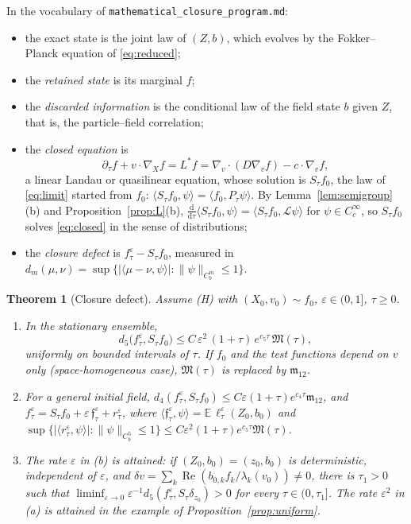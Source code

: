 \documentclass[11pt]{article}
\newcommand{\dd}{\mathrm{d}}
\newcommand{\E}{\mathbb{E}}
\newcommand{\eps}{\varepsilon}
\newcommand{\cL}{\mathcal{L}}
\newcommand{\fm}{\mathfrak{m}}
\newcommand{\fM}{\mathfrak{M}}
\renewcommand{\Re}{\operatorname{Re}}
\newcommand{\nrm}[2]{\|#1\|_{#2}}
\newtheorem{theorem}{Theorem}
\theoremstyle{remark}
\begin{document}
In the vocabulary of \texttt{mathematical\_closure\_program.md}:
\begin{itemize}
  \item the exact state is the joint law of $(Z,b)$, which evolves by the
    Fokker--Planck equation of \eqref{eq:reduced};
  \item the \emph{retained state} is its marginal $f$;
  \item the \emph{discarded information} is the conditional law of the
    field state $b$ given $Z$, that is, the particle--field correlation;
  \item the \emph{closed equation} is
    \begin{equation}
      \partial_\tau f+v\cdot\nabla_Xf=L^*f
      =\nabla_v\cdot(D\nabla_vf)-c\cdot\nabla_vf ,
      \label{eq:closed}
    \end{equation}
    a linear Landau or quasilinear equation, whose solution is
    $S_\tau f_0$, the law of \eqref{eq:limit} started from $f_0$:
    $\langle S_\tau f_0,\psi\rangle=\langle f_0,P_\tau\psi\rangle$. By
    Lemma~\ref{lem:semigroup}(b) and Proposition~\ref{prop:L}(b),
    $\frac{\dd}{\dd\tau}\langle S_\tau f_0,\psi\rangle=\langle S_\tau f_0,
    \cL\psi\rangle$ for $\psi\in C_c^\infty$, so $S_\tau f_0$ solves
    \eqref{eq:closed} in the sense of distributions;
  \item the \emph{closure defect} is $f^\eps_\tau-S_\tau f_0$, measured in
    $d_m(\mu,\nu)=\sup\{|\langle\mu-\nu,\psi\rangle|:\nrm{\psi}{C_b^m}\le1\}$.
\end{itemize}

\begin{theorem}[Closure defect]\label{thm:closure}
Assume (H) with $(X_0,v_0)\sim f_0$, $\eps\in(0,1]$, $\tau\ge0$.
\begin{enumerate}
  \item[(a)] In the stationary ensemble,
    \[
      d_5\bigl(f^\eps_\tau,S_\tau f_0\bigr)\le
      C\,\eps^2\,(1+\tau)\,e^{c_5\tau}\,\fM(\tau),
    \]
    uniformly on bounded intervals of $\tau$. If $f_0$ and the test
    functions depend on $v$ only (space-homogeneous case),
    $\fM(\tau)$ is replaced by $\fm_{12}$.
  \item[(b)] For a general initial field,
    $d_4(f^\eps_\tau,S_\tau f_0)\le C\eps(1+\tau)e^{c_4\tau}\fm_{12}$, and
    $f^\eps_\tau=S_\tau f_0+\eps\,\mathfrak f^\eps_\tau+r^\eps_\tau$, where
    $\langle\mathfrak f^\eps_\tau,\psi\rangle=\E\,\ell^\eps_\tau(Z_0,b_0)$
    and $\sup\{|\langle r^\eps_\tau,\psi\rangle|:\nrm{\psi}{C_b^5}\le1\}\le
    C\eps^2(1+\tau)e^{c_5\tau}\fM(\tau)$.
  \item[(c)] The rate $\eps$ in (b) is attained: if $(Z_0,b_0)=(z_0,b_0)$
    is deterministic, independent of $\eps$, and
    $\delta v=\sum_k\Re(b_{0,k}f_k/\lambda_k(v_0))\ne0$, there is
    $\tau_1>0$ such that
    $\liminf_{\eps\to0}\eps^{-1}d_5(f^\eps_\tau,S_\tau\delta_{z_0})>0$ for
    every $\tau\in(0,\tau_1]$. The rate $\eps^2$ in (a) is attained in the
    example of Proposition~\ref{prop:uniform}.
\end{enumerate}
\end{theorem}
\end{document}
